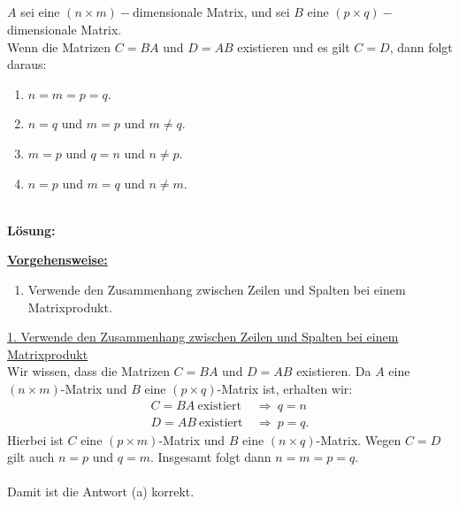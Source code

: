 \newpage

\subsection*{}
$ A $ sei eine $ (n \times m )- $dimensionale Matrix, und sei $ B $ eine $ (p \times q)- $dimensionale Matrix.\\
Wenn die Matrizen $ C = BA $ und $ D = AB $ existieren und es gilt $ C = D $, dann folgt daraus:
\renewcommand{\labelenumi}{(\alph{enumi})}
\begin{enumerate}
	\item 
	$ n= m = p = q $.
	\item 
	$ n = q $ und $ m= p $ und $ m \neq q $.
	\item
	$ m= p $ und $ q = n$ und $ n \neq p $.
	\item
	$ n = p $ und $ m= q $ und $ n \neq m $.
\end{enumerate}
\ \\
\textbf{Lösung:}
\begin{mdframed}
\underline{\textbf{Vorgehensweise:}}
\renewcommand{\labelenumi}{\theenumi.}
\begin{enumerate}
\item Verwende den Zusammenhang zwischen Zeilen und Spalten bei einem Matrixprodukt.
\end{enumerate}
\end{mdframed}

\underline{1. Verwende den Zusammenhang zwischen Zeilen und Spalten bei einem Matrixprodukt}\\
Wir wissen, dass die Matrizen $ C = BA $ und $ D = AB $ existieren.
Da $ A $ eine $ (n \times m) $-Matrix und $ B $ eine $ (p \times q) $-Matrix ist, erhalten wir:
\begin{align*}
	C = BA \ \textrm{existiert} \ 
	&\Rightarrow 
	\
	q = n\\
	D = AB \ \textrm{existiert} \ 
	&\Rightarrow 
	\
	p = q.
\end{align*}
Hierbei ist $ C $ eine $ (p \times m) $-Matrix und $ B  $ eine $(n \times q)$-Matrix.
Wegen $ C = D $ gilt auch $ n = p $ und $ q = m $.
Insgesamt folgt dann $ n = m = p = q $.\\
\\
Damit ist die Antwort (a) korrekt. 


\newpage
